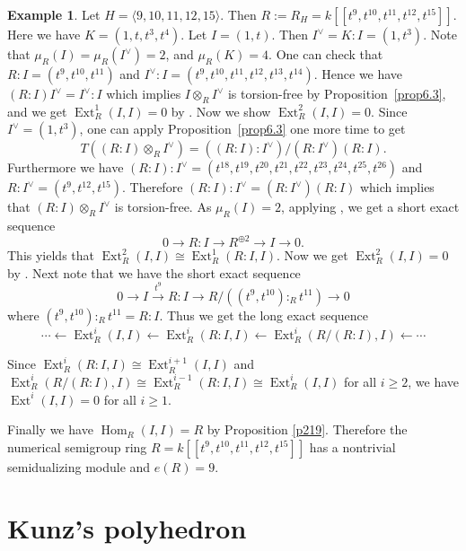 \documentclass{amsart}
\DeclareMathOperator{\Hom}{Hom}
\DeclareMathOperator{\Ext}{Ext}
\theoremstyle{plain}
\theoremstyle{definition}
\newtheorem{example}[theorem]{Example}
\numberwithin{theorem}{section}
\numberwithin{equation}{section}
\numberwithin{equation}{theorem}
\begin{document}
\begin{example} \label{ex7.3} Let $H=\langle 9, 10, 11, 12, 15\rangle $. Then $R:=R_H=k[\![ t^9, t^{10}, t^{11}, t^{12}, t^{15} ]\!]$. Here we have $K=(1, t, t^3, t^4)$.  Let $I=(1,t)$. Then $I^\vee=K:I=(1, t^3)$. Note that $\mu_R(I)=\mu_R(I^\vee)=2$, and $\mu_R(K)=4$. One can check that $R:I=(t^9, t^{10}, t^{11})$ and $I^\vee:I=(t^9, t^{10}, t^{11}, t^{12}, t^{13}, t^{14})$. Hence we have $(R:I)I^\vee=I^\vee:I$ which implies $I\otimes_R I^{\vee}$ is torsion-free by Proposition~\ref{prop6.3}, and we get $\Ext_R^1(I, I)=0$ by \cite[Lemma 4.6]{HW}. Now we show $\Ext^2_R(I, I)=0$. Since $I^{\vee}=(1, t^3)$,  one can apply Proposition~\ref{prop6.3} one more time to get $$T((R:I)\otimes_R I^{\vee})=((R:I):I^{\vee})/(R:I^{\vee})(R:I).$$
Furthermore we have  $(R:I):I^{\vee}=(t^{18}, t^{19}, t^{20}, t^{21}, t^{22}, t^{23}, t^{24}, t^{25}, t^{26})$ and $R:I^{\vee}=(t^9, t^{12}, t^{15} )$. Therefore $(R:I):I^{\vee}=(R:I^{\vee})(R:I)$ which implies that $(R:I)\otimes_R I^{\vee}$ is torsion-free.
As $\mu_R(I)=2$, applying \cite[Lemma 3.3]{HH}, we get a short exact sequence
\[
0 \to R:I \to R^{\oplus 2} \to I \to 0.
\]
This yields that $\Ext^2_R(I, I) \cong \Ext^1_R(R:I, I)$.
Now we get $\Ext^2_R(I, I)=0$ by \cite[Lemma 4.6]{HW}.
Next note that we have the short exact sequence 
\begin{equation} 0\xrightarrow{} I \xrightarrow{t^9} R:I \xrightarrow{} R/ ((t^9, t^{10}):_R t^{11}) \xrightarrow{} 0 
\end{equation}
where $(t^9, t^{10}):_R t^{11}=R:I$. Thus we get the long exact sequence 
\begin{equation}\cdots \xleftarrow{} \Ext_R^i(I, I)\xleftarrow{} \Ext_R^i(R:I, I) \xleftarrow{} \Ext^i_R(R/(R:I), I) \xleftarrow{} \cdots 
\end{equation}

Since $\Ext_R^i(R:I, I) \cong \Ext_R^{i+1} (I,I)$ and $\Ext^i_R(R/(R:I), I) \cong \Ext^{i-1}_R(R:I, I) \cong \Ext^i_R(I, I)$ for all $i\geq 2$, we have $\Ext^i (I, I) = 0$ for all $i\ge 1$. 


Finally we have $\Hom_R(I,I)=R$ by Proposition \ref{p219}.
Therefore the numerical semigroup ring $R=k[\![ t^9, t^{10}, t^{11}, t^{12}, t^{15} ]\!]$ has a nontrivial semidualizing module and $e(R)=9$. 
\end{example} 

\section{Kunz's polyhedron} \label{section3}
\end{document}
